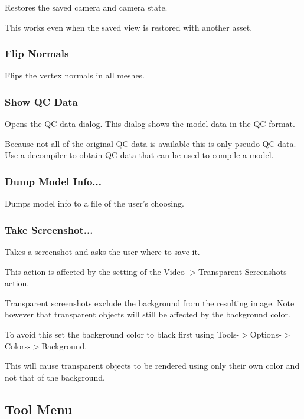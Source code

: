 \documentclass[10pt, a4paper, titlepage, oneside]{article}
\begin{document}
Restores the saved camera and camera state.

This works even when the saved view is restored with another asset.

\subsubsection{Flip Normals}

Flips the vertex normals in all meshes.

\subsubsection{Show QC Data}

Opens the QC data dialog. This dialog shows the model data in the QC format.

Because not all of the original QC data is available this is only pseudo-QC data. Use a decompiler to obtain QC data that can be used to compile a model.

\subsubsection{Dump Model Info...}

Dumps model info to a file of the user's choosing.

\subsubsection{Take Screenshot...}

Takes a screenshot and asks the user where to save it.

This action is affected by the setting of the Video-$>$Transparent Screenshots action.

Transparent screenshots exclude the background from the resulting image. Note however that transparent objects will still be affected by the background color.

\begin{sloppy}
To avoid this set the background color to black first using \mbox{Tools-$>$Options-$>$Colors-$>$Background}.
\end{sloppy}

This will cause transparent objects to be rendered using only their own color and not that of the background.

\subsection{Tool Menu}
\end{document}
